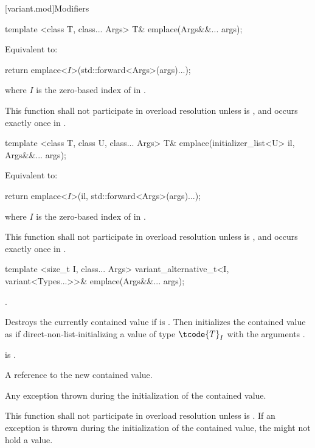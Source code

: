 [variant.mod]{Modifiers}

%
\begin{itemdecl}
template <class T, class... Args> T& emplace(Args&&... args);
\end{itemdecl}

\begin{itemdescr}
\pnum
\effects
Equivalent to:
\begin{codeblock}
return emplace<$I$>(std::forward<Args>(args)...);
\end{codeblock}
where $I$ is the zero-based index of  in .

\pnum
\remarks
This function shall not participate in overload resolution unless
 is , and  occurs
exactly once in .
\end{itemdescr}

%
\begin{itemdecl}
template <class T, class U, class... Args> T& emplace(initializer_list<U> il, Args&&... args);
\end{itemdecl}

\begin{itemdescr}
\pnum
\effects
Equivalent to:
\begin{codeblock}
return emplace<$I$>(il, std::forward<Args>(args)...);
\end{codeblock}
where $I$ is the zero-based index of  in .

\pnum
\remarks
This function shall not participate in overload resolution unless
 is ,
and  occurs exactly once in .
\end{itemdescr}

%
\begin{itemdecl}
template <size_t I, class... Args>
  variant_alternative_t<I, variant<Types...>>& emplace(Args&&... args);
\end{itemdecl}

\begin{itemdescr}
\pnum
\requires
{}.

\pnum
\effects
Destroys the currently contained value if 
is .
Then initializes the contained value as if direct-non-list-initializing
a value of type $\tcode{T}_I$
with the arguments .

\pnum
\postconditions
{} is .

\pnum
\returns
A reference to the new contained value.

\pnum
\throws
Any exception thrown during the initialization of the contained value.

\pnum
\remarks
This function shall not participate in overload resolution unless
 is .
If an exception is thrown during the initialization of the contained value,
the  might not hold a value.
\end{itemdescr}

